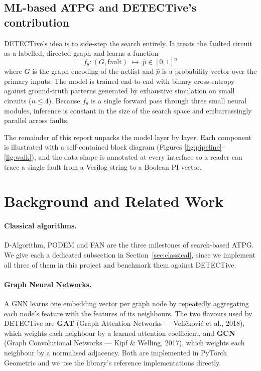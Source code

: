 \documentclass[11pt,a4paper]{article}
\newcommand{\bd}[1]{\textbf{#1}}
\begin{document}
\subsection{ML-based ATPG and DETECTive's contribution}

DETECTive's idea is to side-step the search entirely. It treats the
faulted circuit as a labelled, directed graph and learns a function
\[
  f_\theta : (G, \text{fault}) \;\mapsto\; \hat{p} \in [0,1]^{n}
\]
where $G$ is the graph encoding of the netlist and $\hat{p}$ is a
probability vector over the primary inputs. The model is trained
end-to-end with binary cross-entropy against ground-truth patterns
generated by exhaustive simulation on small circuits ($n \!\le\! 4$).
Because $f_\theta$ is a single forward pass through three small neural
modules, inference is constant in the size of the search space and
embarrassingly parallel across faults.

The remainder of this report unpacks the model layer by layer. Each
component is illustrated with a self-contained block diagram (Figures
\ref{fig:pipeline}--\ref{fig:walk}), and the data shape is annotated at
every interface so a reader can trace a single fault from a Verilog
string to a Boolean PI vector.

\section{Background and Related Work}
\label{sec:bg}

\paragraph{Classical algorithms.} D-Algorithm, PODEM and FAN are the
three milestones of search-based ATPG. We give each a dedicated
subsection in Section~\ref{sec:classical}, since we implement all
three of them in this project and benchmark them against DETECTive.

\paragraph{Graph Neural Networks.} A GNN learns one embedding vector per
graph node by repeatedly aggregating each node's feature with the
features of its neighbours. The two flavours used by DETECTive are
\bd{GAT} (Graph Attention Networks --- Veli\v{c}kovi\'c et al., 2018),
which weights each neighbour by a learned attention coefficient, and
\bd{GCN} (Graph Convolutional Networks --- Kipf \& Welling, 2017),
which weights each neighbour by a normalised adjacency. Both are
implemented in PyTorch Geometric and we use the library's reference
implementations directly.
\end{document}
